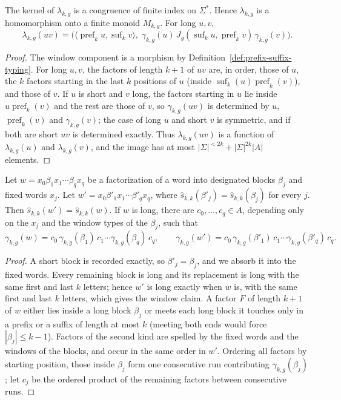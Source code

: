 \begin{lemma}
\label{lem:local-group-morphism}
The kernel of $\lambda_{k,g}$ is a congruence of finite index on
$\Sigma^*$.  Hence $\lambda_{k,g}$ is a homomorphism onto a finite
monoid $M_{k,g}$.  For long $u,v$,
\[
 \lambda_{k,g}(uv)
 =\bigl(\langle\operatorname{pref}_k u,\operatorname{suf}_k v\rangle,\;
   \gamma_{k,g}(u)\,J_g(\operatorname{suf}_k u,\operatorname{pref}_k v)\,
   \gamma_{k,g}(v)\bigr).
\]
\end{lemma}

\begin{proof}
The window component is a morphism by
Definition~\ref{def:prefix-suffix-typing}.  For long $u,v$, the factors of
length $k+1$ of $uv$ are, in order, those of $u$, the $k$ factors starting in
the last $k$ positions of $u$ (inside
$\operatorname{suf}_k(u)\operatorname{pref}_k(v)$), and those of $v$.  If $u$
is short and $v$ long, the factors starting in $u$ lie inside
$u\operatorname{pref}_k(v)$ and the rest are those of $v$, so
$\gamma_{k,g}(uv)$ is determined by $u$, $\operatorname{pref}_k(v)$ and
$\gamma_{k,g}(v)$; the case of long $u$ and short $v$ is symmetric, and if
both are short $uv$ is determined exactly.  Thus $\lambda_{k,g}(uv)$ is a
function of $\lambda_{k,g}(u)$ and $\lambda_{k,g}(v)$, and the image has at
most $|\Sigma|^{<2k}+|\Sigma|^{2k}|A|$ elements.
\end{proof}

\begin{lemma}
\label{lem:local-group-blocks}
Let $w=x_0\beta_1x_1\cdots\beta_qx_q$ be a factorization of a word into
designated blocks $\beta_j$ and fixed words $x_j$.  Let
$w'=x_0\beta'_1x_1\cdots\beta'_qx_q$, where
$\widehat{s}_{k,k}(\beta'_j)=\widehat{s}_{k,k}(\beta_j)$ for every $j$.
Then $\widehat{s}_{k,k}(w')=\widehat{s}_{k,k}(w)$.  If $w$ is long, there are
$c_0,\ldots,c_q\in A$, depending only on the $x_j$ and the window types
of the $\beta_j$, such that
\[
 \gamma_{k,g}(w)=c_0\,\gamma_{k,g}(\beta_1)\,c_1\cdots
   \gamma_{k,g}(\beta_q)\,c_q,
 \qquad
 \gamma_{k,g}(w')=c_0\,\gamma_{k,g}(\beta'_1)\,c_1\cdots
   \gamma_{k,g}(\beta'_q)\,c_q.
\]
\end{lemma}

\begin{proof}
A short block is recorded exactly, so $\beta'_j=\beta_j$, and we absorb it into
the fixed words.  Every remaining block is long and its replacement is long
with the same first and last $k$ letters; hence $w'$ is long exactly when $w$
is, with the same first and last $k$ letters, which gives the window claim.  A
factor $F$ of length $k+1$ of $w$ either lies inside a long block $\beta_j$ or
meets each long block it touches only in a prefix or a suffix of length at
most $k$ (meeting both ends would force $|\beta_j|\le k-1$).  Factors of the
second kind are spelled by the fixed words and the windows of the blocks, and
occur in the same order in $w'$.  Ordering all factors by starting position,
those inside $\beta_j$ form one consecutive run contributing
$\gamma_{k,g}(\beta_j)$; let $c_j$ be the ordered product of the remaining
factors between consecutive runs.
\end{proof}

